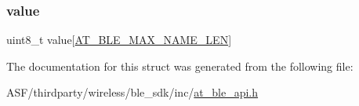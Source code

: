 \subsubsection{\texorpdfstring{value}{value}}
{\footnotesize\ttfamily uint8\+\_\+t value\mbox{[}\mbox{\hyperlink{at__ble__api_8h_ade8ce3f882f05dd2b9e5da4c2d6142ba}{A\+T\+\_\+\+B\+L\+E\+\_\+\+M\+A\+X\+\_\+\+N\+A\+M\+E\+\_\+\+L\+EN}}\mbox{]}}



The documentation for this struct was generated from the following file\+:\begin{DoxyCompactItemize}
\item 
A\+S\+F/thirdparty/wireless/ble\+\_\+sdk/inc/\mbox{\hyperlink{at__ble__api_8h}{at\+\_\+ble\+\_\+api.\+h}}\end{DoxyCompactItemize}
